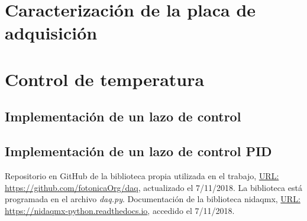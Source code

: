 \documentclass[a4paper,11pt]{article}
\begin{document}
\section{Caracterización de la placa de adquisición}

\section{Control de temperatura}
\label{sec:control_temperatura}

\subsection{Implementación de un lazo de control}

\subsection{Implementación de un lazo de control PID}




\clearpage

\begin{thebibliography}{99}

	 Repositorio en GitHub de la biblioteca propia utilizada en el trabajo, \href{https://github.com/fotonicaOrg/daq}{URL: https://github.com/fotonicaOrg/daq}, actualizado el 7/11/2018. La biblioteca está programada en el archivo \emph{daq.py}.
	 Documentación de la biblioteca nidaqmx, \href{https://nidaqmx-python.readthedocs.io}{URL: https://nidaqmx-python.readthedocs.io}, accedido el 7/11/2018.


\end{thebibliography}
\end{document}
